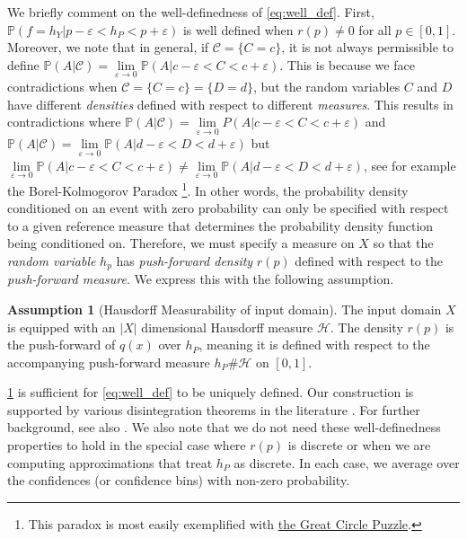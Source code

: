 \documentclass[10pt]{article} %
\theoremstyle{definition}
\newtheorem{assume}{Assumption}
\begin{document}
We briefly comment on the well-definedness of \cref{eq:well_def}. First, $\mathbb{P}\left(f=h_Y| p - \varepsilon < h_P < p + \varepsilon\right)$ is well defined when $r(p) \neq 0$ for all $p \in [0,1]$. Moreover, we note that in general, if $\mathcal C = \{C = c\}$, it is not always permissible to define $\mathbb{P} (A|\mathcal C) = \underset{\varepsilon \to 0}{\lim} \mathbb{P} (A| c - \varepsilon < C < c + \varepsilon)$. This is because we face contradictions when $\mathcal C = \{C = c\} = \{D = d\}$, but the random variables $C$ and $D$ have different \textit{densities} defined with respect to different \textit{measures}. This results in contradictions where $\mathbb{P} (A|\mathcal C) = \underset{\varepsilon \to 0}{\lim}P(A| c - \varepsilon < C < c + \varepsilon)$ and $ \mathbb{P} (A|\mathcal C) = \underset{\varepsilon \to 0}{\lim} \mathbb{P}(A| d - \varepsilon < D < d + \varepsilon)$ but $ \underset{\varepsilon \to 0}{\lim} \mathbb{P} (A| c - \varepsilon < C < c + \varepsilon) \neq  \underset{\varepsilon \to 0}{\lim} \mathbb{P}(A| d - \varepsilon < D < d + \varepsilon)$, see for example the Borel-Kolmogorov Paradox \citep{andrey1933grundbegriffe, MR1992316}\footnote{This paradox is most easily exemplified with \href{https://en.m.wikipedia.org/wiki/Borel-Kolmogorov_paradox\#A_great_circle_puzzle}{the Great Circle Puzzle}.}. In other words, the probability density conditioned on an event with zero probability can only be specified with respect to a given reference measure that determines the probability density function being conditioned on. Therefore, we must specify a measure on $X$ so that the \textit{random variable} $h_p$ has \textit{push-forward density} $r(p)$ defined with respect to the \textit{push-forward measure}. We express this with the following assumption.  

\begin{assume}[Hausdorff Measurability of input domain] \label{ass:house} The input domain $X$ is equipped with an $|X|$ dimensional Hausdorff measure $\mathcal{H}$. The density $r(p)$ is the push-forward of $q(x)$ over $h_P$, meaning it is defined with respect to the accompanying push-forward measure $h_P \# \mathcal{H}$ on $[0,1]$. 
\end{assume}

\cref{ass:house} is sufficient for \cref{eq:well_def} to be uniquely defined. Our construction is supported by various disintegration theorems in the literature \citep[e.g.][]{pachl1978disintegration, chang1997conditioning}. For further background, see also \cite{rokhlin1949endomorphisms, bogachev2007measure}. We also note that we do not need these well-definedness properties to hold in the special case where $r(p)$ is discrete or when we are computing approximations that treat $h_{P}$ as discrete. In each case, we average over the confidences (or confidence bins) with non-zero probability.
\end{document}
